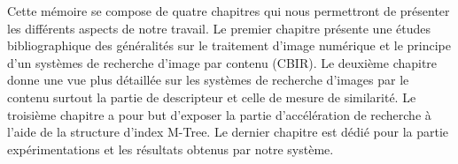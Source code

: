 Cette mémoire se compose de quatre chapitres qui nous permettront de
présenter les différents aspects de notre travail. Le premier chapitre présente une études bibliographique des généralités sur le traitement d’image numérique et le principe d'un systèmes de recherche d’image par contenu (CBIR). Le deuxième chapitre donne une vue plus détaillée sur les systèmes de recherche d’images par le contenu surtout la partie de descripteur et celle de mesure de similarité. Le troisième chapitre a pour but d’exposer la partie d'accélération de recherche à l'aide de la structure d'index M-Tree. Le dernier chapitre est dédié pour la partie expérimentations et les résultats obtenus par notre système.